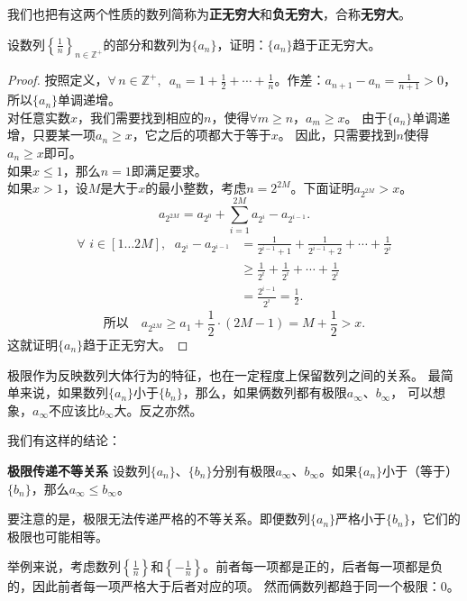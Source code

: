 \documentclass[12pt,UTF8,fontset=none]{ctexbook}
\begin{document}
我们也把有这两个性质的数列简称为\textbf{正无穷大}和\textbf{负无穷大}，合称\textbf{无穷大}。

\begin{et}
    设数列$\left\{\frac{1}{n}\right\}_{n\in\mathbb{Z}^+}$的部分和数列为$\{a_n\}$，证明：$\{a_n\}$趋于正无穷大。
\end{et}
\begin{proof}
    按照定义，$ \forall \, n\in\mathbb{Z}^+,\,\,\,a_n = 1 + \frac{1}{2} + \cdots + \frac{1}{n}$。作差：$a_{n+1} - a_n = \frac{1}{n+1} > 0$，所以$\{a_n\}$单调递增。\\
    对任意实数$x$，我们需要找到相应的$n$，使得$\forall m \geqslant n$，$a_m \geqslant x$。
    由于$\{a_n\}$单调递增，只要某一项$a_n \geqslant x$，它之后的项都大于等于$x$。
    因此，只需要找到$n$使得$a_n \geqslant x$即可。\\
    如果$x \leqslant 1$，那么$n=1$即满足要求。\\
    如果$x > 1$，设$M$是大于$x$的最小整数，考虑$n = 2^{2M}$。下面证明$a_{2^{2M}}>x$。\\
    $$ a_{2^{2M}} = a_{2^0} + \sum_{i=1}^{2M}a_{2^i} - a_{2^{i-1}}.$$
    \begin{align*}
        \forall \,\, i\in[1\ldots 2M],\;\,\, a_{2^i} - a_{2^{i-1}} &= \frac{1}{2^{i-1}+1} + \frac{1}{2^{i-1}+2} + \cdots + \frac{1}{2^{i}}  \\
        &\geqslant \frac{1}{2^{i}} + \frac{1}{2^{i}} + \cdots + \frac{1}{2^{i}}  \\
        &= \frac{2^{i-1}}{2^{i}} = \frac{1}{2}. 
    \end{align*}
    $$ \mbox{所以}\quad  a_{2^{2M}} \geqslant a_1 + \frac{1}{2} \cdot (2M - 1) = M + \frac{1}{2} > x. $$
    这就证明$\{a_n\}$趋于正无穷大。
\end{proof}

极限作为反映数列大体行为的特征，也在一定程度上保留数列之间的关系。
最简单来说，如果数列$\{a_n\}$小于$\{b_n\}$，那么，如果俩数列都有极限$a_\infty$、$b_\infty$，
可以想象，$a_\infty$不应该比$b_\infty$大。反之亦然。

我们有这样的结论：
\begin{tm}{\textbf{极限传递不等关系}}
    设数列$\{a_n\}$、$\{b_n\}$分别有极限$a_\infty$、$b_\infty$。如果$\{a_n\}$小于（等于）$\{b_n\}$，那么$a_\infty\leqslant b_\infty$。
\end{tm}
要注意的是，极限无法传递严格的不等关系。即便数列$\{a_n\}$严格小于$\{b_n\}$，它们的极限也可能相等。

举例来说，考虑数列$\left\{\frac{1}{n}\right\}$和$\left\{-\frac{1}{n}\right\}$。前者每一项都是正的，后者每一项都是负的，因此前者每一项严格大于后者对应的项。
然而俩数列都趋于同一个极限：$0$。
\end{document}

